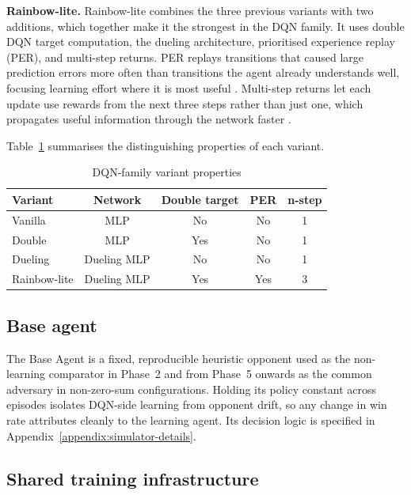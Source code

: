 \textbf{Rainbow-lite.} Rainbow-lite combines the three previous variants with two additions, which together make it the strongest in the DQN family. It uses double DQN target computation, the dueling architecture, prioritised experience replay (PER), and multi-step returns. PER replays transitions that caused large prediction errors more often than transitions the agent already understands well, focusing learning effort where it is most useful \citep{schaul2016prioritized}. Multi-step returns let each update use rewards from the next three steps rather than just one, which propagates useful information through the network faster \citep{hessel2018rainbow}.


Table~\ref{tab:dqn-variants} summarises the distinguishing properties of each variant.

\begin{table}[htbp]
\centering
\small
\caption{DQN-family variant properties}
\label{tab:dqn-variants}
\begin{tabular}{|l|c|c|c|c|}
\hline
\textbf{Variant} & \textbf{Network} & \textbf{Double target} & \textbf{PER} & \textbf{n-step} \\
\hline
Vanilla       & MLP         & No  & No  & 1 \\
Double        & MLP         & Yes & No  & 1 \\
Dueling       & Dueling MLP & No  & No  & 1 \\
Rainbow-lite  & Dueling MLP & Yes & Yes & 3 \\
\hline
\end{tabular}
\end{table}

\subsection{Base agent}

The Base Agent is a fixed, reproducible heuristic opponent used as the non-learning comparator in Phase~2 and from Phase~5 onwards as the common adversary in non-zero-sum configurations. Holding its policy constant across episodes isolates DQN-side learning from opponent drift, so any change in win rate attributes cleanly to the learning agent. Its decision logic is specified in Appendix~\ref{appendix:simulator-details}.

\subsection{Shared training infrastructure}

